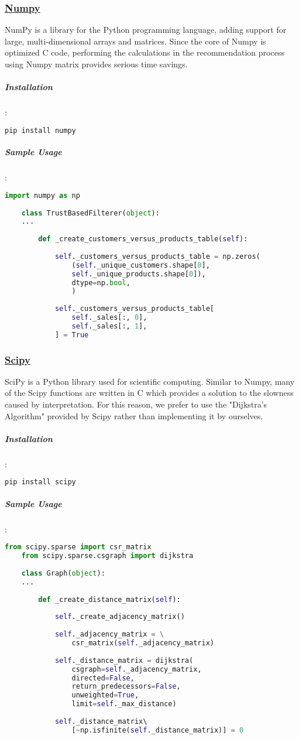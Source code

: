 	\subsubsection{\href{https://numpy.org/}{Numpy}}
	NumPy is a library for the Python programming language, adding support for large, multi-dimensional arrays and matrices. Since the core of Numpy is optimized C code, performing the calculations in the recommendation process using Numpy matrix provides serious time savings.
	\subparagraph{Installation}:
	\begin{lstlisting}[language=bash]
	pip install numpy
	\end{lstlisting}
	
	\subparagraph{Sample Usage}:
	\begin{lstlisting}[language=python, caption=Numpy example]
	import numpy as np
	
	class TrustBasedFilterer(object):
	...
	
		def _create_customers_versus_products_table(self):
	
			self._customers_versus_products_table = np.zeros(
				(self._unique_customers.shape[0],
				self._unique_products.shape[0]),
				dtype=np.bool,
				)
	
			self._customers_versus_products_table[
				self._sales[:, 0],
				self._sales[:, 1],
			] = True
	\end{lstlisting}
	
	\subsubsection{\href{https://www.scipy.org/}{Scipy}}
	SciPy is a Python library used for scientific computing. Similar to Numpy, many of the Scipy functions are written in C which provides a solution to the slowness caused by interpretation. For this reason, we prefer to use the "Dijkstra's Algorithm" provided by Scipy rather than implementing it by ourselves.
	\subparagraph{Installation}:
	\begin{lstlisting}[language=bash]
	pip install scipy
	\end{lstlisting}
	
	\subparagraph{Sample Usage}:
	\begin{lstlisting}[language=python, caption=Scipy example]
	from scipy.sparse import csr_matrix
	from scipy.sparse.csgraph import dijkstra
	
	class Graph(object):
	...
	
		def _create_distance_matrix(self):
	
			self._create_adjacency_matrix()
	
			self._adjacency_matrix = \
				csr_matrix(self._adjacency_matrix)
	
			self._distance_matrix = dijkstra( 
				csgraph=self._adjacency_matrix, 
				directed=False, 
				return_predecessors=False, 
				unweighted=True,
				limit=self._max_distance)
	
			self._distance_matrix\ 
				[~np.isfinite(self._distance_matrix)] = 0
	\end{lstlisting}
